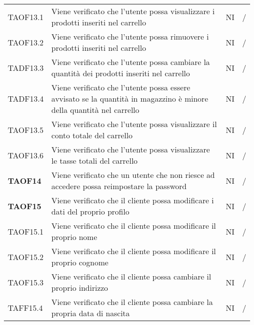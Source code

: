 \begin{center}
\begin{longtable}[!h]{p{60px} p{240px} p{35px} p{35px}}
        TAOF13.1        & Viene verificato che l'utente possa visualizzare i prodotti inseriti nel carrello                                    & NI             & /              \\
        TAOF13.2        & Viene verificato che l'utente possa rimuovere i prodotti inseriti nel carrello                                       & NI             & /              \\
        TADF13.3        & Viene verificato che l'utente possa cambiare la quantità dei prodotti inseriti nel carrello                          & NI             & /              \\
        TADF13.4        & Viene verificato che l'utente possa essere avvisato se la quantità in magazzino è minore della quantità nel carrello & NI             & /              \\
        TAOF13.5        & Viene verificato che l'utente possa visualizzare il conto totale del carrello                                        & NI             & /              \\
        TAOF13.6        & Viene verificato che l'utente possa visualizzare le tasse totali del carrello                                        & NI             & /              \\
        \textbf{TAOF14} & Viene verificato che un utente che non riesce ad accedere possa reimpostare la password                              & NI             & /              \\
        \textbf{TAOF15} & Viene verificato che il cliente possa modificare i dati del proprio profilo                                          & NI             & /              \\
        TAOF15.1        & Viene verificato che il cliente possa modificare il proprio nome                                                     & NI             & /              \\
        TAOF15.2        & Viene verificato che il cliente possa modificare il proprio cognome                                                  & NI             & /              \\
        TAOF15.3        & Viene verificato che il cliente possa cambiare il proprio indirizzo                                                  & NI             & /              \\
        TAFF15.4        & Viene verificato che il cliente possa cambiare la propria data di nascita                                            & NI             & /              \\

\end{longtable}
\end{center}
